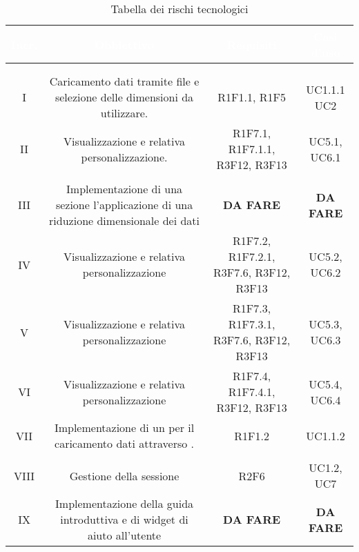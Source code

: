 \setlength\colA{1.5cm}
\setlength\colB{8cm}
\setlength\colC{4cm}
\setlength\colD{2cm}
\setlength\total{\dimexpr\colA+\colB+\colC+\colD+6\tabcolsep\relax}
\begin{longtable}{C{\colA} C{\colB} C{\colC} C{\colD}}
		\textcolor{white}{\textbf{Incr.}} & 
		\textcolor{white}{\textbf{Obbiettivo}} & 
		\textcolor{white}{\textbf{Requisiti}} & 
		\textcolor{white}{\textbf{Casi d'uso}} \\
		\endfirsthead
	    \\
	    \endfoot
	    \caption{Tabella dei rischi tecnologici}
	    \endlastfoot


\\
I &
Caricamento dati tramite file e selezione delle dimensioni da utilizzare.& 
R1F1.1, R1F5 & 
UC1.1.1 \newline UC2\\
II &
Visualizzazione  e relativa personalizzazione.& 
R1F7.1, R1F7.1.1, R3F12, R3F13 & 
UC5.1, UC6.1\\
\\
III & 
Implementazione di una sezione l'applicazione di una riduzione dimensionale dei dati & 
\textbf{DA FARE}& 
\textbf{DA FARE}\\
IV & 
Visualizzazione  e relativa personalizzazione & 
R1F7.2, R1F7.2.1, R3F7.6, R3F12, R3F13 & 
UC5.2, UC6.2\\
V & 
Visualizzazione  e relativa personalizzazione & 
R1F7.3, R1F7.3.1, R3F7.6, R3F12, R3F13& 
UC5.3, UC6.3\\
VI & 
Visualizzazione  e relativa personalizzazione & 
R1F7.4, R1F7.4.1, R3F12, R3F13& 
UC5.4, UC6.4\\
VII & 
Implementazione di un  per il caricamento dati attraverso . & 
R1F1.2 & 
UC1.1.2\\

\\
VIII & 
Gestione della sessione & 
R2F6 & 
UC1.2, UC7\\
IX & 
Implementazione della guida introduttiva e di widget di aiuto all'utente & 
\textbf{DA FARE}& 
\textbf{DA FARE}\\


\end{longtable}
